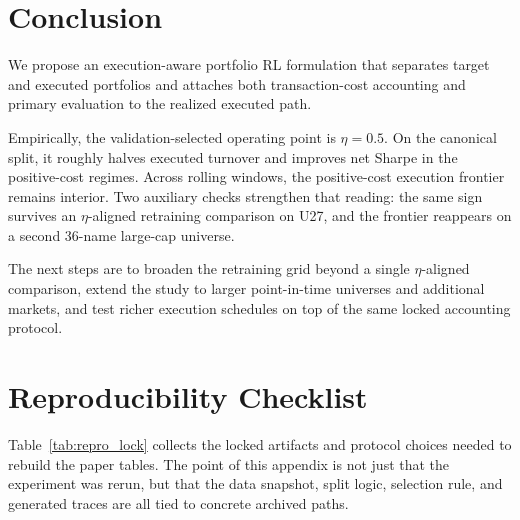 \documentclass[10pt,twocolumn]{article}
\begin{document}
\section{Conclusion}
We propose an execution-aware portfolio RL formulation that separates target and executed portfolios and attaches both transaction-cost accounting and primary evaluation to the realized executed path.

Empirically, the validation-selected operating point is $\eta=0.5$. On the canonical split, it roughly halves executed turnover and improves net Sharpe in the positive-cost regimes. Across rolling windows, the positive-cost execution frontier remains interior. Two auxiliary checks strengthen that reading: the same sign survives an $\eta$-aligned retraining comparison on U27, and the frontier reappears on a second 36-name large-cap universe.

The next steps are to broaden the retraining grid beyond a single $\eta$-aligned comparison, extend the study to larger point-in-time universes and additional markets, and test richer execution schedules on top of the same locked accounting protocol.

\appendix
\clearpage
\onecolumn
\section{Reproducibility Checklist}
\label{app:repro}
Table~\ref{tab:repro_lock} collects the locked artifacts and protocol choices needed to rebuild the paper tables. The point of this appendix is not just that the experiment was rerun, but that the data snapshot, split logic, selection rule, and generated traces are all tied to concrete archived paths.
\end{document}
